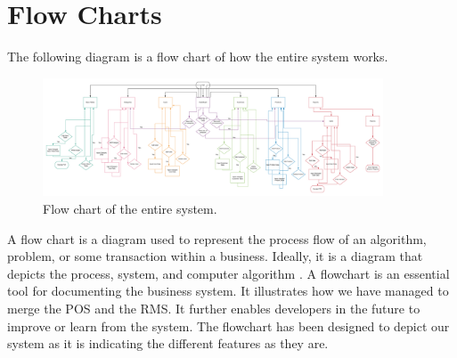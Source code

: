 \section{Flow Charts}

The following diagram is a flow chart of how the entire system works.
\begin{figure}[h!]
	\caption{Flow chart of the entire system.}
	\label{image:myImageName}
	\centering
	\includegraphics[width=0.9\textwidth]{Fig images/Flowchart.png}
\end{figure}

A flow chart is a diagram used to represent the process flow of an algorithm, problem, or some transaction within a business. Ideally, it is a diagram that depicts the process, system, and computer algorithm \cite{CHRT}. A flowchart is an essential tool for documenting the business system. It illustrates how we have managed to merge the POS and the RMS. It further enables developers in the future to improve or learn from the system. The flowchart has been designed to depict our system as it is indicating the different features as they are. 


